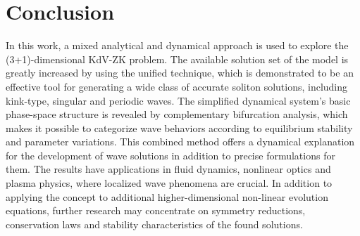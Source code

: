 \documentclass{article}
\numberwithin{equation}{section}
\begin{document}
\section{Conclusion}\label{s5}
\noindent In this work, a mixed analytical and dynamical approach is used to explore the (3+1)-dimensional KdV-ZK problem. The available solution set of the model is greatly increased by using the unified technique, which is demonstrated to be an effective tool for generating a wide class of accurate soliton solutions, including kink-type, singular and periodic waves. The simplified dynamical system's basic phase-space structure is revealed by complementary bifurcation analysis, which makes it possible to categorize wave behaviors according to equilibrium stability and parameter variations. This combined method offers a dynamical explanation for the development of wave solutions in addition to precise formulations for them. The results have applications in fluid dynamics, nonlinear optics and plasma physics, where localized wave phenomena are crucial. In addition to applying the concept to additional higher-dimensional non-linear evolution equations, further research may concentrate on symmetry reductions, conservation laws and stability characteristics of the found solutions.
\end{document}
